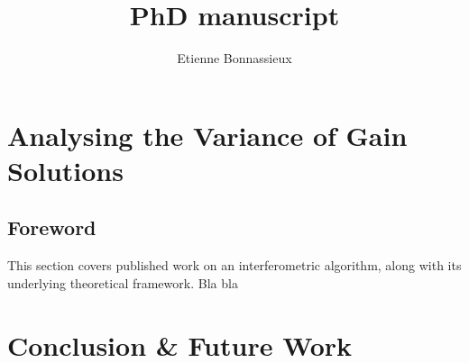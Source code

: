 \documentclass[11pt,a4paper,notitlepage]{book}
\author{Etienne Bonnassieux}
\title{PhD manuscript}
\begin{document}

%
%

\newpage
\setcounter{page}{1}









\chapter{Analysing the Variance of Gain Solutions}

\section{Foreword}
\pg
This section covers published work on an interferometric algorithm, along with its underlying theoretical framework. Bla bla



%
%











\chapter{Conclusion \& Future Work}



%
%



\end{document}
